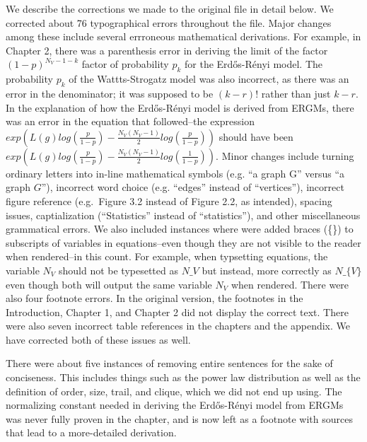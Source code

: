 \documentclass[12pt,twoside]{amherstthesis}
\begin{document}
  We describe the corrections we made to the original file in detail
  below. We corrected about 76 typographical errors throughout the file.
  Major changes among these include several errroneous mathematical
  derivations. For example, in Chapter 2, there was a parenthesis error in
  deriving the limit of the factor \((1 - p)^{N_{V} - 1 - k}\) factor of
  probability \(p_{k}\) for the Erdős-Rényi model. The probability
  \(p_{k}\) of the Wattts-Strogatz model was also incorrect, as there was
  an error in the denominator; it was supposed to be \((k - r)!\) rather
  than just \(k - r\). In the explanation of how the Erdős-Rényi model is
  derived from ERGMs, there was an error in the equation that
  followed--the expression
  \(exp \left(L(g)log \left(\frac {p} {1-p} \right) - \frac {N_{V}(N_{V} - 1)} {2} log \left( \frac {p} {1-p} \right) \right)\)
  should have been
  \(exp \left(L(g)log \left(\frac {p} {1-p} \right) - \frac {N_{V}(N_{V} - 1)} {2} log \left( \frac {1} {1 - p} \right) \right)\).
  Minor changes include turning ordinary letters into in-line mathematical
  symbols (e.g. ``a graph G'' versus ``a graph \(G\)''), incorrect word
  choice (e.g. ``edges'' instead of ``vertices''), incorrect figure
  reference (e.g.~Figure 3.2 instead of Figure 2.2, as intended), spacing
  issues, captialization (``Statistics'' instead of ``statistics''), and
  other miscellaneous grammatical errors. We also included instances where
  were added braces (\{\}) to subscripts of variables in equations--even
  though they are not visible to the reader when rendered--in this count.
  For example, when typsetting equations, the variable \(N_{V}\) should
  not be typesetted as \(N\_V\) but instead, more correctly as
  \(N\_\{V\}\) even though both will output the same variable \(N_{V}\)
  when rendered. There were also four footnote errors. In the original
  version, the footnotes in the Introduction, Chapter 1, and Chapter 2 did
  not display the correct text. There were also seven incorrect table
  references in the chapters and the appendix. We have corrected both of
  these issues as well.
  
  There were about five instances of removing entire sentences for the
  sake of conciseness. This includes things such as the power law
  distribution as well as the definition of order, size, trail, and
  clique, which we did not end up using. The normalizing constant needed
  in deriving the Erdős-Rényi model from ERGMs was never fully proven in
  the chapter, and is now left as a footnote with sources that lead to a
  more-detailed derivation.
  
\end{document}
